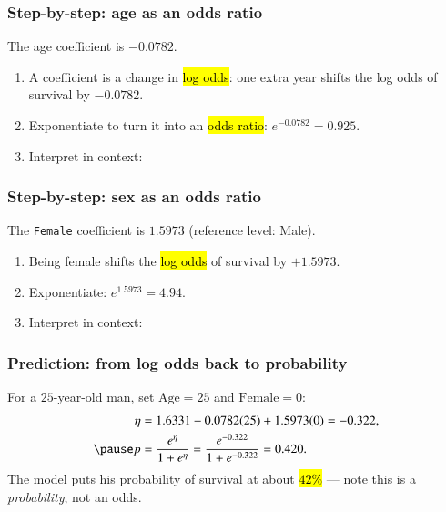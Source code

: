 \documentclass[slidestop,compress,mathserif]{beamer}
\begin{document}
\begin{frame}
\frametitle{Step-by-step: age as an odds ratio}

The age coefficient is $-0.0782$.

\begin{enumerate}
\item A coefficient is a change in \hl{log odds}: one extra year shifts the log odds of survival by $-0.0782$.
\pause
\item Exponentiate to turn it into an \hl{odds ratio}: \; $e^{-0.0782}=0.925$.
\pause
\item Interpret in context:
\end{enumerate}

\pause
{}

\end{frame}
\begin{frame}
\frametitle{Step-by-step: sex as an odds ratio}

The \texttt{Female} coefficient is $1.5973$ (reference level: Male).

\begin{enumerate}\setlength{\itemsep}{2pt}
\item Being female shifts the \hl{log odds} of survival by $+1.5973$.
\pause
\item Exponentiate: \; $e^{1.5973}=4.94$.
\pause
\item Interpret in context:
\end{enumerate}

\pause
\vspace{-0.5em}

\pause
\vspace{-0.5em}

\end{frame}
\begin{frame}
\frametitle{Prediction: from log odds back to probability}

For a $25$-year-old man, set $\text{Age}=25$ and $\text{Female}=0$:
\begin{align*}
\eta &= 1.6331-0.0782(25)+1.5973(0) = -0.322,\\
\pause
p &= \frac{e^{\eta}}{1+e^{\eta}} = \frac{e^{-0.322}}{1+e^{-0.322}} = 0.420.
\end{align*}
\pause
The model puts his probability of survival at about \hl{$42\%$} --- note this is a \emph{probability}, not an odds.

\end{frame}
\end{document}

